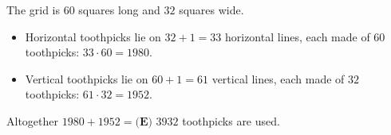 The grid is $60$ squares long and $32$ squares wide.
\begin{itemize}
\item Horizontal toothpicks lie on $32+1=33$ horizontal lines, each made of $60$ toothpicks: $33\cdot60=1980$.
\item Vertical toothpicks lie on $60+1=61$ vertical lines, each made of $32$ toothpicks: $61\cdot32=1952$.
\end{itemize}
Altogether $1980+1952=\boxed{\textbf{(E) }3932}$ toothpicks are used.
